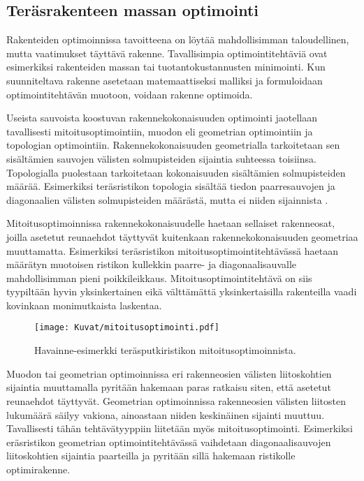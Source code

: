 \documentclass[12pt]{article}
\newenvironment{content}{\pagenumbering{arabic}}{}
\begin{document}
\begin{content}
\subsection{Teräsrakenteen massan optimointi}

Rakenteiden optimoinnissa tavoitteena on löytää mahdollisimman taloudellinen, mutta vaatimukset täyttävä rakenne. Tavallisimpia optimointitehtäviä ovat esimerkiksi rakenteiden massan tai tuotantokustannusten minimointi. Kun suunniteltava rakenne asetetaan matemaattiseksi malliksi ja formuloidaan optimointitehtävän muotoon, voidaan rakenne optimoida.  

Useista sauvoista koostuvan rakennekokonaisuuden optimointi jaotellaan tavallisesti mitoitusoptimointiin, muodon eli geometrian optimointiin ja topologian optimointiin. Rakennekokonaisuuden geometrialla tarkoitetaan sen sisältämien sauvojen välisten solmupisteiden sijaintia suhteessa toisiinsa. Topologialla puolestaan tarkoitetaan kokonaisuuden sisältämien solmupisteiden määrää. Esimerkiksi teräsristikon topologia sisältää tiedon paarresauvojen ja diagonaalien välisten solmupisteiden määrästä, mutta ei niiden sijainnista \parencite[2]{mela_doct}.

Mitoitusoptimoinnissa rakennekokonaisuudelle haetaan sellaiset rakenneosat, joilla asetetut reunaehdot täyttyvät kuitenkaan rakennekokonaisuuden geometriaa muuttamatta. Esimerkiksi teräsristikon mitoitusoptimointitehtävässä haetaan määrätyn muotoisen ristikon kullekkin paarre- ja diagonaalisauvalle mahdollisimman pieni poikkileikkaus. Mitoitusoptimointitehtävä on siis tyypiltään hyvin yksinkertainen eikä välttämättä yksinkertaisilla rakenteilla vaadi kovinkaan monimutkaista laskentaa.
\begin{figure}[htb]

\texttt{[image: Kuvat/mitoitusoptimointi.pdf]}
\caption{Havainne-esimerkki teräsputkiristikon mitoitusoptimoinnista.}
\label{fig:mitoitusoptimointi}
\end{figure}

Muodon tai geometrian optimoinnissa eri rakenneosien välisten liitoskohtien sijaintia muuttamalla pyritään hakemaan paras ratkaisu siten, että asetetut reunaehdot täyttyvät. Geometrian optimoinnissa rakenneosien välisten liitosten lukumäärä säilyy vakiona, ainoastaan niiden keskinäinen sijainti muuttuu. Tavallisesti tähän tehtävätyyppiin liitetään myös mitoitusoptimointi. Esimerkiksi eräsristikon geometrian optimointitehtävässä vaihdetaan diagonaalisauvojen liitoskohtien sijaintia paarteilla ja pyritään sillä hakemaan ristikolle optimirakenne.


\end{content}
\end{document}
